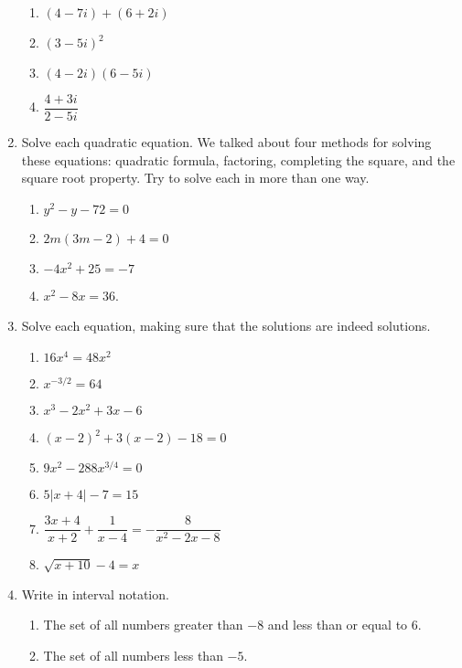 \documentclass[12pt]{article}
\begin{document}
\begin{enumerate}
\begin{multicols}{2}
\begin{enumerate}
				\item $(4-7i)+(6+2i)$\vskip 1in
				\item $(3-5i)^2$\vskip 1in
				\item $(4-2i)(6-5i)$\vskip 1in
				\item $\dfrac{4+3i}{2-5i}$\vskip 1in
			\end{enumerate}
		\end{multicols}
		\vskip 1.5in
		\item Solve each quadratic equation. We talked about four methods for solving these equations: quadratic formula, factoring, completing the square, and the square root property. Try to solve each in more than one way.
		\begin{multicols}{2}
			\begin{enumerate}
				\item $y^2-y-72=0$\vskip 2in
				\item $2m(3m-2)+4=0$\vskip 2in
				\item $-4x^2+25=-7$\vskip 2in
				\item $x^2-8x=36$.\vskip 2in
			\end{enumerate}
		\end{multicols}
		\newpage
		\item Solve each equation, making sure that the solutions are indeed solutions.
		\begin{multicols}{2}
			\begin{enumerate}	
				\item $16x^4=48x^2$
				\vskip 2in
				\item $x^{-3/2} = 64$
				\vskip 2in
				\item $x^3-2x^2+3x-6$
				\vskip 2in
				\item $(x-2)^2+3(x-2)-18=0$
				\vskip 2in
				\item $9x^2-288x^{3/4}=0$
				\vskip 2in
				\item $5|x+4|-7=15$
				\vskip 2in
				\item $\dfrac{3x+4}{x+2}+\dfrac{1}{x-4}=-\dfrac{8}{x^2-2x-8}$
				\vskip 2in
				\item $\sqrt{x+10}-4 = x$
				\vskip 2in
			\end{enumerate}
		\end{multicols}
	\newpage
	\item Write in interval notation.
		\begin{enumerate}
			\item The set of all numbers greater than $-8$ and less than or equal to $6$.
			\item The set of all numbers less than $-5$.	

\end{enumerate}
\end{enumerate}
\end{document}
